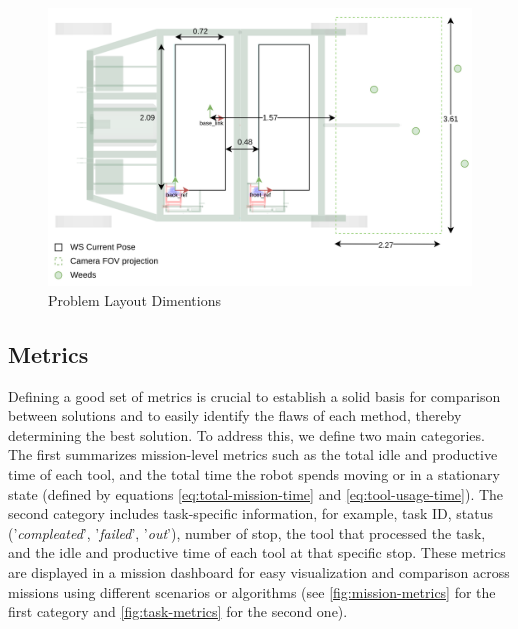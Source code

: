\begin{figure}[bth]
    \centering
    \includegraphics[width=\linewidth]{gfx/ch02/problem_layout.png}
    \caption{Problem Layout Dimentions}
    \label{fig:problem-layout.png}
\end{figure}

\subsection{Metrics}
Defining a good set of metrics is crucial to establish a solid basis for comparison between solutions and to easily identify the flaws of each method, thereby determining the best solution. To address this, we define two main categories. The first summarizes mission-level metrics such as the total idle and productive time of each tool, and the total time the robot spends moving or in a stationary state (defined by equations \ref{eq:total-mission-time} and \ref{eq:tool-usage-time}). The second category includes task-specific information, for example, task ID, status ('\textit{compleated}', '\textit{failed}', '\textit{out}'), number of stop, the tool that processed the task, and the idle and productive time of each tool at that specific stop. These metrics are displayed in a mission dashboard for easy visualization and comparison across missions using different scenarios or algorithms (see \autoref{fig:mission-metrics} for the first category and \ref{fig:task-metrics} for the second one).

